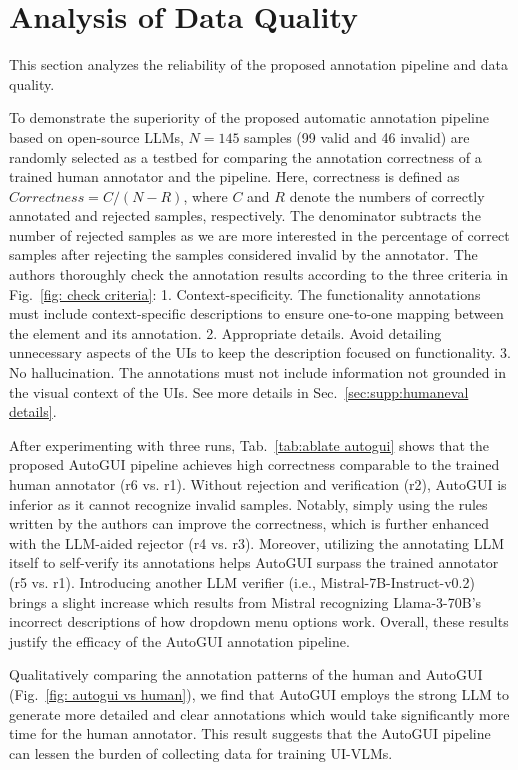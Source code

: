 \section{Analysis of Data Quality}
This section analyzes the reliability of the proposed annotation pipeline and data quality.

 To demonstrate the superiority of the proposed automatic annotation pipeline based on open-source LLMs, $N=145$ samples (99 valid and 46 invalid) are randomly selected as a testbed for comparing the annotation correctness of a trained human annotator and the pipeline. Here, correctness is defined as $Correctness = C / (N - R)$, where $C$ and $R$ denote the numbers of correctly annotated and rejected samples, respectively. The denominator subtracts the number of rejected samples as we are more interested in the percentage of correct samples after rejecting the samples considered invalid by the annotator. The authors thoroughly check the annotation results according to the three criteria in Fig.~\ref{fig: check criteria}: 1. Context-specificity. The functionality annotations must include context-specific descriptions to ensure one-to-one mapping between the element and its annotation. 2. Appropriate details. Avoid detailing unnecessary aspects of the UIs to keep the description focused on functionality. 3. No hallucination. The annotations must not include information not grounded in the visual context of the UIs. See more details in Sec.~\ref{sec:supp:humaneval details}.

After experimenting with three runs, Tab.~\ref{tab:ablate autogui} shows that the proposed AutoGUI pipeline achieves high correctness comparable to the trained human annotator (r6 vs. r1). Without rejection and verification (r2), AutoGUI is inferior as it cannot recognize invalid samples. Notably, simply using the rules written by the authors can improve the correctness, which is further enhanced with the LLM-aided rejector (r4 vs. r3). Moreover, utilizing the annotating LLM itself to self-verify its annotations helps AutoGUI surpass the trained annotator (r5 vs. r1). Introducing another LLM verifier (i.e., Mistral-7B-Instruct-v0.2) brings a slight increase which results from Mistral recognizing Llama-3-70B’s incorrect descriptions of how dropdown menu options work. Overall, these results justify the efficacy of the AutoGUI annotation pipeline.

Qualitatively comparing the annotation patterns of the human and AutoGUI (Fig.~\ref{fig: autogui vs human}), we find that AutoGUI employs the strong LLM to generate more detailed and clear annotations which would take significantly more time for the human annotator. This result suggests that the AutoGUI pipeline can lessen the burden of collecting data for training UI-VLMs.

